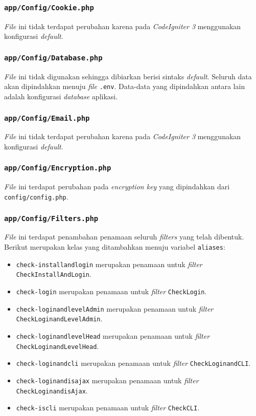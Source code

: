 \subsubsection{\texttt{app/Config/Cookie.php}}
\textit{File} ini tidak terdapat perubahan karena pada \textit{CodeIgniter 3} menggunakan konfigurasi \textit{default}.
\subsubsection{\texttt{app/Config/Database.php}}
\textit{File} ini tidak digunakan sehingga dibiarkan berisi sintaks \textit{default}. Seluruh data akan dipindahkan menuju \textit{file} \texttt{.env}. Data-data yang dipindahkan antara lain adalah konfigurasi \textit{database} aplikasi.
\subsubsection{\texttt{app/Config/Email.php}}
\textit{File} ini tidak terdapat perubahan karena pada \textit{CodeIgniter 3} menggunakan konfigurasi \textit{default}.
\subsubsection{\texttt{app/Config/Encryption.php}}
\textit{File} ini terdapat perubahan pada \textit{encryption key} yang dipindahkan dari \texttt{config/config.php}.
\subsubsection{\texttt{app/Config/Filters.php}}
\textit{File} ini terdapat penambahan penamaan seluruh \textit{filters} yang telah dibentuk. Berikut merupakan kelas yang ditambahkan menuju variabel \texttt{aliases}:
\begin{itemize}
	\item \texttt{check-installandlogin} merupakan penamaan untuk \textit{filter} \texttt{CheckInstallAndLogin}.
	\item \texttt{check-login} merupakan penamaan untuk \textit{filter} \texttt{CheckLogin}.
	\item \texttt{check-loginandlevelAdmin} merupakan penamaan untuk \textit{filter} \texttt{CheckLoginandLevelAdmin}.
	\item \texttt{check-loginandlevelHead} merupakan penamaan untuk \textit{filter} \texttt{CheckLoginandLevelHead}.
	\item \texttt{check-loginandcli} merupakan penamaan untuk \textit{filter} \texttt{CheckLoginandCLI}.
	\item \texttt{check-loginandisajax} merupakan penamaan untuk \textit{filter} \texttt{CheckLoginandisAjax}.
	\item \texttt{check-iscli} merupakan penamaan untuk \textit{filter} \texttt{CheckCLI}.
\end{itemize}
